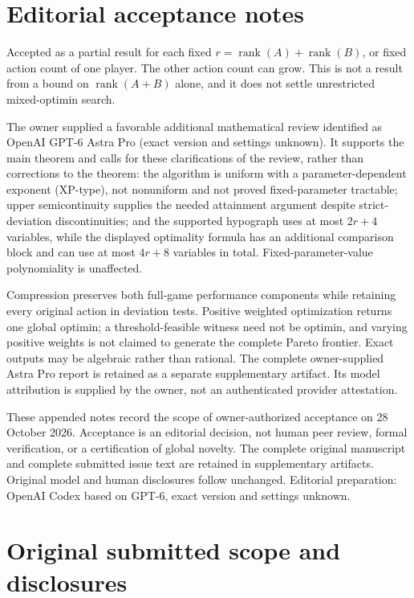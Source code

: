 \documentclass[11pt]{article}
\theoremstyle{remark}
\begin{document}
\section{Editorial acceptance notes}

Accepted as a partial result for each fixed \(r=\operatorname{rank}(A)+\operatorname{rank}(B)\), or fixed action count of one player. The other action count can grow. This is not a result from a bound on \(\operatorname{rank}(A+B)\) alone, and it does not settle unrestricted mixed-optimin search.

The owner supplied a favorable additional mathematical review identified as OpenAI GPT-6 Astra Pro (exact version and settings unknown). It supports the main theorem and calls for these clarifications of the review, rather than corrections to the theorem: the algorithm is uniform with a parameter-dependent exponent (XP-type), not nonuniform and not proved fixed-parameter tractable; upper semicontinuity supplies the needed attainment argument despite strict-deviation discontinuities; and the supported hypograph uses at most \(2r+4\) variables, while the displayed optimality formula has an additional comparison block and can use at most \(4r+8\) variables in total. Fixed-parameter-value polynomiality is unaffected.

Compression preserves both full-game performance components while retaining every original action in deviation tests. Positive weighted optimization returns one global optimin; a threshold-feasible witness need not be optimin, and varying positive weights is not claimed to generate the complete Pareto frontier. Exact outputs may be algebraic rather than rational. The complete owner-supplied Astra Pro report is retained as a separate supplementary artifact. Its model attribution is supplied by the owner, not an authenticated provider attestation.

These appended notes record the scope of owner-authorized acceptance on 28 October 2026. Acceptance is an editorial decision, not human peer review, formal verification, or a certification of global novelty. The complete original manuscript and complete submitted issue text are retained in supplementary artifacts. Original model and human disclosures follow unchanged. Editorial preparation: OpenAI Codex based on GPT-6, exact version and settings unknown.

\section{Original submitted scope and disclosures}
\end{document}
